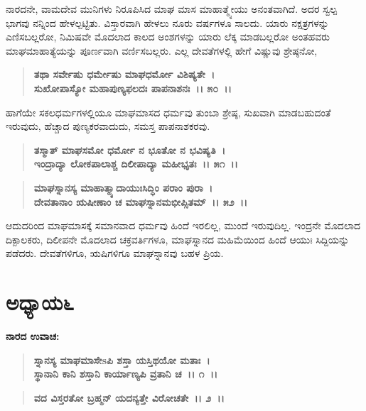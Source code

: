 ನಾರದನೇ, ವಾಮದೇವ ಮುನಿಗಳು ನಿರೂಪಿಸಿದ ಮಾಘ ಮಾಸ ಮಾಹಾತ್ಮ್ಯೇಯು ಅನಂತವಾಗಿದೆ. ಅದರ ಸ್ವಲ್ಪ ಭಾಗವು ನನ್ನಿಂದ ಹೇಳಲ್ಪಟ್ಟಿತು. ವಿಸ್ತಾರವಾಗಿ ಹೇಳಲು ನೂರು ವರ್ಷಗಳೂ ಸಾಲದು. ಯಾರು ನಕ್ಷತ್ರಗಳನ್ನು ಎಣಿಸಬಲ್ಲರೋ, ನಿಮಿಷವೇ ಮೊದಲಾದ ಕಾಲದ ಅಂಶಗಳನ್ನು ಯಾರು ಲೆಕ್ಕ ಮಾಡಬಲ್ಲರೋ ಅಂತಹವರು ಮಾಘಮಾಹಾತ್ಯೆಯನ್ನು ಪೂರ್ಣವಾಗಿ ವರ್ಣಿಸಬಲ್ಲರು. ಎಲ್ಲ ದೇವತೆಗಳಲ್ಲಿ ಹೇಗೆ ವಿಷ್ಣುವು ಶ್ರೇಷ್ಠನೋ,

\begin{verse}
\textbf{ತಥಾ ಸರ್ವೇಷು ಧರ್ಮೇಷು ಮಾಘಧರ್ಮೋ ವಿಶಿಷ್ಯತೇ~।}\\\textbf{ಸುಖೋಪಾಸ್ಯೋ ಮಹಾಪುಣ್ಯಫಲದಃ ಪಾಪನಾಶನಃ~।। ೫೦~।।}
\end{verse}

ಹಾಗೆಯೇ ಸಕಲಧರ್ಮಗಳಲ್ಲಿಯೂ ಮಾಘಮಾಸದ ಧರ್ಮವು ತುಂಬಾ ಶ್ರೇಷ್ಠ, ಸುಖವಾಗಿ ಮಾಡಬಹುದಂತೆ ಇರುವುದು, ಹೆಚ್ಚಾದ ಪುಣ್ಯಕರವಾದುದು, ಸಮಸ್ತ ಪಾಪನಾಶಕರವು.

\begin{verse}
\textbf{ತಸ್ಮಾತ್ ಮಾಘಸಮೋ ಧರ್ಮೋ ನ ಭೂತೋ ನ ಭವಿಷ್ಯತಿ~।}\\\textbf{ಇಂದ್ರಾದ್ಯಾ ಲೋಕಪಾಲಾಶ್ಚ ದಿಲೀಪಾದ್ಯಾ ಮಹೀಭೃತಃ~।। ೫೧~।।} 
\end{verse}

\begin{verse}
\textbf{ಮಾಘಸ್ನಾನಸ್ಯ ಮಾಹಾತ್ಮ್ಯಾದಾಯುಃಸಿದ್ಧಿಂ ಪರಾಂ ಪುರಾ~।}\\\textbf{ದೇವತಾನಾಂ ಋಷೀಣಾಂ ಚ ಮಾಘಸ್ನಾನಮಭೀಪ್ಸಿತಮ್~।। ೫೨~।।}
\end{verse}

ಆದುದರಿಂದ ಮಾಘಮಾಸಕ್ಕೆ ಸಮಾನವಾದ ಧರ್ಮವು ಹಿಂದೆ ಇರಲಿಲ್ಲ, ಮುಂದೆ ಇರುವುದಿಲ್ಲ. ಇಂದ್ರನೇ ಮೊದಲಾದ ದಿಕ್ಪಾಲಕರು, ದಿಲೀಪನೇ ಮೊದಲಾದ ಚಕ್ರವರ್ತಿಗಳೂ, ಮಾಘಸ್ನಾನದ ಮಹಿಮೆಯಿಂದ ಹಿಂದೆ ಆಯುಃ ಸಿದ್ದಿಯನ್ನು ಪಡೆದರು. ದೇವತೆಗಳಿಗೂ, ಋಷಿಗಳಿಗೂ ಮಾಘಸ್ನಾನವು ಬಹಳ ಪ್ರಿಯ.

\newpage

\section*{ಅಧ್ಯಾಯ\enginline{-}೬}

\begin{flushleft}
\textbf{ನಾರದ ಉವಾಚ:\enginline{-}}
\end{flushleft}

\begin{verse}
\textbf{ಸ್ನಾನಸ್ಯ ಮಾಘಮಾಸೇsಪಿ ಶಸ್ತಾ ಯಸ್ತಿಥಯೋ ಮತಾಃ~।}\\\textbf{ಸ್ಥಾನಾನಿ ಕಾನಿ ಶಸ್ತಾನಿ ಕಾರ್ಯಾಣ್ಯಪಿ ವ್ರತಾನಿ ಚ~।। ೧~।।}
\end{verse}

\begin{verse}
\textbf{ವದ ವಿಸ್ತರತೋ ಬ್ರಹ್ಮನ್ ಯದನ್ಯತ್ತೇ ವಿರೋಚತೇ~।। ೨~।।}
\end{verse}


